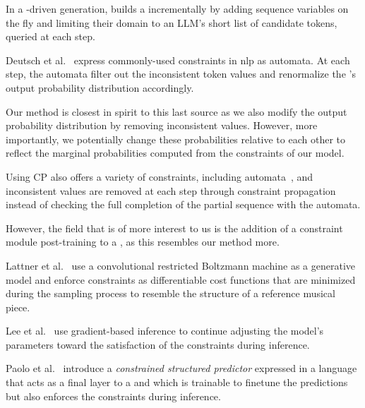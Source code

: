 \documentclass[../Document.tex]{subfiles}
\begin{document}
In a \cp-driven generation, \cite{DBLP:conf/cp/ReginMB24} builds a \csp incrementally by adding sequence variables on the fly and limiting their domain to an LLM's short list of candidate tokens, queried at each step.

Deutsch et al.~\cite{deutsch2019general} express commonly-used constraints in \gls{nlp} as automata. At each step, the automata filter out the inconsistent token values and renormalize the \nn's output probability distribution accordingly.

Our method is closest in spirit to this last source as we also modify the output probability distribution by removing inconsistent values. However, more importantly, we potentially change these probabilities relative to each other to reflect the marginal probabilities computed from the constraints of our \cp model.

Using CP also offers a variety of constraints, including automata~\cite{DBLP:conf/cp/Pesant04}, and inconsistent values are removed at each step through constraint propagation instead of checking the full completion of the partial sequence with the automata.

However, the field that is of more interest to us is the addition of a constraint module post-training to a \nn, as this resembles our method more.

Lattner et al.~\cite{lattner2018imposing} use a convolutional restricted Boltzmann machine as a generative model and enforce constraints as differentiable cost functions that are minimized during the sampling process to resemble the structure of a reference musical piece.

Lee et al.~\cite{lee2019gradient} use gradient-based inference to continue adjusting the model's parameters toward the satisfaction of the constraints during inference.

Paolo et al.~\cite{DBLP:conf/nesy/DragoneTP21} introduce a \emph{constrained structured predictor} expressed in a \cp language that acts as a final layer to a \nn and which is trainable to finetune the predictions but also enforces the constraints during inference.
\end{document}
